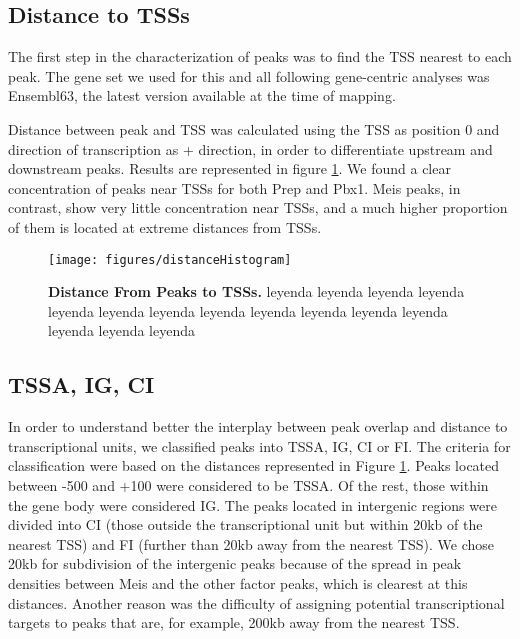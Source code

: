 \subsection{Distance to \ac{TSS}s}

The first step in the characterization of peaks was to find the \ac{TSS} nearest to each peak. The gene set we used for this and all following gene-centric analyses was Ensembl63, the latest version available at the time of mapping.

Distance between peak and \ac{TSS} was calculated using the \ac{TSS} as position 0 and direction of transcription as + direction, in order to differentiate upstream and downstream peaks. Results are represented in figure \ref{fig:distanceHistogram}. We found a clear  concentration of peaks near \ac{TSS}s for both Prep and Pbx1. Meis peaks, in contrast, show very little concentration near \ac{TSS}s, and a much higher proportion of them is located at extreme distances from \ac{TSS}s. 

\begin{figure}[]
  
  \centering
  \label{fig:distanceHistogram}
  \texttt{[image: figures/distanceHistogram]}
  \caption[Distance From Peaks to \ac{TSS}s]{\textbf{Distance From Peaks to \ac{TSS}s.} leyenda leyenda leyenda leyenda leyenda leyenda leyenda leyenda leyenda leyenda leyenda leyenda leyenda leyenda leyenda}
\end{figure}


\subsection{TSSA, IG, CI}

In order to understand better the interplay between peak overlap and distance to transcriptional units, we classified peaks into \ac{TSSA}, \ac{IG}, \ac{CI} or \ac{FI}. The criteria for classification were based on the  distances represented in Figure \ref{fig:distanceHistogram}. Peaks located between -500 and +100 were considered to be \ac{TSSA}. Of the rest, those within the gene body were considered \ac{IG}. The peaks located in intergenic regions were divided into \ac{CI} (those outside the transcriptional unit but within 20kb of the nearest \ac{TSS}) and \ac{FI} (further than 20kb away from the nearest \ac{TSS}). 
We chose 20kb for subdivision of the intergenic peaks because of the spread in peak densities between Meis and the other factor peaks, which is clearest at this distances. Another reason was the difficulty of assigning potential transcriptional targets to peaks that are, for example, 200kb away from the nearest \ac{TSS}.


